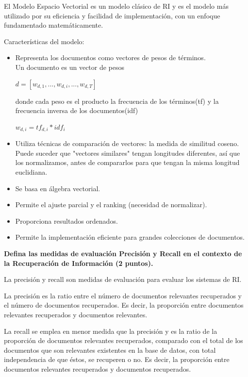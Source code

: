 \documentclass[11pt]{exam}
\begin{document}
\begin{questions}
El Modelo Espacio Vectorial es un modelo clásico de RI y es el modelo más utilizado por su eficiencia y facilidad de implementación, con un enfoque fundamentado matemáticamente.

\newpage

Características del modelo:

\begin{itemize}
	\item Representa los documentos como vectores de pesos de términos. \\
	Un documento es un vector de pesos \\
	\begin{center}
		$d = [w_{d,1}, ..., w_{d,i}, ..., w_{d,T}]$
	\end{center}
	donde cada peso es el producto la frecuencia de los términos(tf) y la frecuencia inversa de los documentos(idf)
		\begin{center}
		$w_{d,i} = tf_{d,i} * idf_{i}$
	\end{center}
	\item Utiliza técnicas de comparación de vectores: la medida de similitud coseno. \\
	Puede suceder que "vectores similares" tengan longitudes diferentes, así que los normalizamos, antes de compararlos para que tengan la misma longitud euclidiana.
	\item Se basa en álgebra vectorial.
	\item Permite el ajuste parcial y el ranking (necesidad de normalizar).
	\item Proporciona resultados ordenados.
	\item Permite la implementación eficiente para grandes colecciones de documentos.
\end{itemize}

{\bf \question Defina las medidas de evaluación Precisión y Recall en el contexto de la Recuperación de Información (2 puntos).}

La precisión y recall son medidas de evaluación para evaluar los sistemas de RI.

La precisión es la ratio entre el número de documentos relevantes recuperados y el número de documentos recuperados. Es decir, la proporción entre documentos relevantes recuperados y documentos relevantes.

La recall se emplea en menor medida que la precisión y es la ratio de la proporción de documentos relevantes recuperados, comparado con el total de los documentos que son relevantes existentes en la base de datos, con total independencia de que éstos, se recuperen o no. Es decir, la proporción entre documentos relevantes recuperados y documentos recuperados.


\end{questions}
\end{document}

